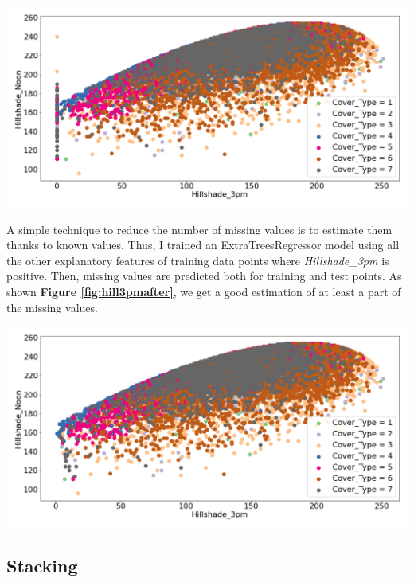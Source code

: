 \documentclass{article}
\newenvironment{Figure}
  {\par\medskip\noindent\minipage{\linewidth}}
  {\endminipage\par\medskip}
\begin{document}
\begin{multicols}{2}
\begin{Figure}
  \centering
  \captionsetup{type=figure}
  \includegraphics[width=0.85\linewidth]{figures/hill3pmbefore.png}
  \label{fig:hill3pmbefore}
\end{Figure}

A simple technique to reduce the number of missing values is to estimate
them thanks to known values. Thus, I trained an ExtraTreesRegressor model using
all the other explanatory features of training data points where
\textit{Hillshade\_3pm} is positive.
Then, missing
values are
predicted both for training and test points. As shown
\textbf{Figure \ref{fig:hill3pmafter}}, we get a good estimation of at least
a part of the missing values.

\begin{Figure}
  \centering
  \captionsetup{type=figure}
  \includegraphics[width=0.85\linewidth]{figures/hill3pmafter.png}
  \label{fig:hill3pmafter}
\end{Figure}

\subsection{Stacking}


\end{multicols}
\end{document}
